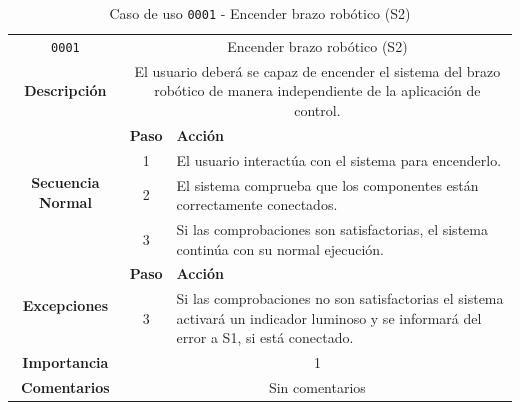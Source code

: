 \begin{table}[H]
    \centering
    \begin{tabularx}{\textwidth}{|c|c|X|}
        \cline{1-3}
        \texttt{0001}                              & \multicolumn{2}{c|}{Encender brazo robótico (\ac{S2})}                                                                                                                      \\ \cline{1-3}
        \textbf{Descripción}                       & \multicolumn{2}{m{13cm}|}{El usuario deberá se capaz de encender el sistema del brazo robótico de manera independiente de la aplicación de control.}
        \\ \cline{1-3}
        \multirow{4}{*}{\textbf{Secuencia Normal}} & \textbf{Paso} & \textbf{Acción}
        \\ \cline{2-3}                    &   1  & El usuario interactúa con el sistema para encenderlo.
        \\ \cline{2-3}                    &   2  & El sistema comprueba que los componentes están correctamente conectados.
        \\ \cline{2-3}                    &   3  & Si las comprobaciones son satisfactorias, el sistema continúa con su normal ejecución.
        \\ \cline{1-3}
        \multirow{2}{*}{\textbf{Excepciones}}      & \textbf{Paso}                                                                                                                                        & \textbf{Acción}
        \\ \cline{2-3}                    &   3  & Si las comprobaciones no son satisfactorias el sistema activará un indicador luminoso y se informará del error a \ac{S1}, si está conectado.
        \\ \cline{1-3}
        \textbf{Importancia}                       & \multicolumn{2}{c|}{1}                                                                                                                                                 \\ \cline{1-3}
        \textbf{Comentarios}                       & \multicolumn{2}{c|}{Sin comentarios}                                                                                                                                   \\ \cline{1-3}
    \end{tabularx}
    \caption{Caso de uso \texttt{0001} - Encender brazo robótico (\ac{S2})}
    \label{tab:CU0001}
    \label{tab:caso_de_uso_encender_brazo_robotico}
\end{table}

